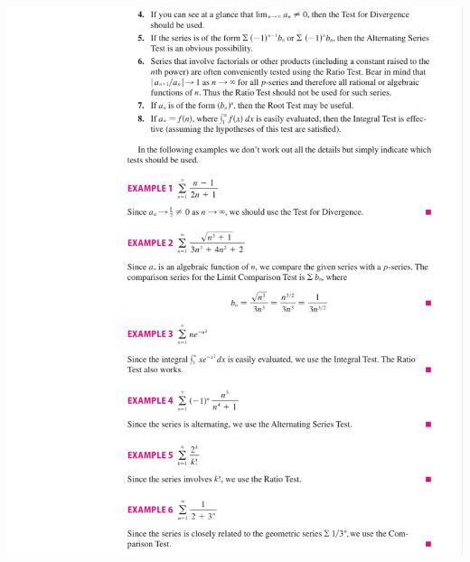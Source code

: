 \documentclass[12pt]{article}
\begin{document}
\includegraphics[width=18.5cm]{IMG_2702.jpg}
\end{document}
